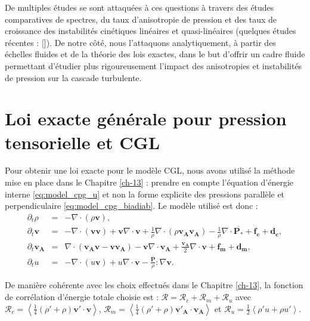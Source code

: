 De multiples études se sont attaquées à ces questions à travers des études comparatives de spectres, du taux d'anisotropie de pression et des taux de croissance des instabilités cinétiques linéaires et quasi-linéaires (quelques études récentes : [\cite{qudsi_intermittency_2020,markovskii_effect_2022,opie_conditions_2022,bandyopadhyay_interplay_2022,navarro_effects_2023}]). 
De notre côté, nous l'attaquons analytiquement, à partir des échelles fluides et de la théorie des lois exactes, dans le but d'offrir un cadre fluide permettant d'étudier plus rigoureusement l'impact des anisotropies et instabilités de pression sur la cascade turbulente.

\section{Loi exacte générale pour pression tensorielle et \acs{CGL}}
\label{sec-213}

Pour obtenir une loi exacte pour le modèle \ac{CGL}, nous avons utilisé la méthode mise en place dans le Chapitre \ref{ch-13} : prendre en compte l'équation d'énergie interne \eqref{eq:model_cpg_u} et non la forme explicite des pressions parallèle et perpendiculaire \eqref{eq:model_cpg_biadiab}. Le modèle utilisé est donc :
\begin{eqnarray}
\label{eq:turb_cpg_r} \partial_t \rho &=& - \nabla \cdot \left(\rho \boldsymbol{v}\right) , \\
\label{eq:turb_cpg_v}\partial_t  \boldsymbol{v} &=&- \nabla \cdot \left(\boldsymbol{v}\boldsymbol{v}\right) + \boldsymbol{v} \nabla \cdot \boldsymbol{v}  + \frac{1}{\rho} \nabla \cdot \left(\rho \boldsymbol{v_A}\boldsymbol{v_A}\right) - \frac{1}{\rho}  \nabla \cdot \overline{\boldsymbol{P_*}}  + \boldsymbol{f_c} + \boldsymbol{d_c} ,\\
\label{eq:turb_cpg_b}\partial_t \boldsymbol{v_A} &=&   \nabla \cdot \left(\boldsymbol{v_A}\boldsymbol{v} - \boldsymbol{v}\boldsymbol{v_A}\right) -  \boldsymbol{v}  \nabla \cdot \boldsymbol{v_A} +  \frac{\boldsymbol{v_A}}{2}  \nabla \cdot \boldsymbol{v} + \boldsymbol{f_m} + \boldsymbol{d_m} ,\\
\label{eq:turb_cpg_u}    \partial_t u  &=& - \nabla \cdot \left(u \boldsymbol{v} \right) + u  \nabla \cdot \boldsymbol{v}  -  \frac{\overline{\boldsymbol{P}}}{\rho} : \nabla \boldsymbol{v} . 
\end{eqnarray}

De manière cohérente avec les choix effectués dans le Chapitre \ref{ch-13}, la fonction de corrélation d'énergie totale choisie est : $\mathcal{R} = \mathcal{R}_{c} + \mathcal{R}_{m} + \mathcal{R}_{u}$ avec $\mathcal{R}_{c} = \left<\frac{1}{4} \left(\rho'+\rho\right) \boldsymbol{v'} \cdot  \boldsymbol{v} \right>$, $\mathcal{R}_{m} = \left<\frac{1}{4} \left(\rho'+\rho\right) \boldsymbol{v'_A} \cdot  \boldsymbol{v_A} \right>$ et $\mathcal{R}_{u} = \frac{1}{2}\left< \rho' u + \rho u'\right> $. 

